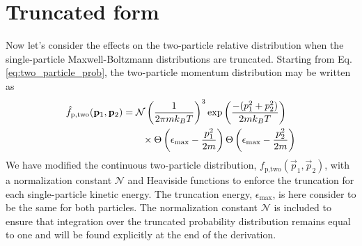 \section{Truncated form}\label{sec:truncDist}
Now let's consider the effects on the two-particle relative distribution when the single-particle Maxwell-Boltzmann distributions are truncated.
Starting from Eq.\,\ref{eq:two_particle_prob}, the two-particle momentum distribution may be written as
\begin{equation}
\begin{split}
	\hat{f}_\text{p,two} (\mathbf{p}_1, \mathbf{p}_2) &= \mathcal{N} \left(\frac{1}{2 \pi m k_B T}\right)^3 \text{exp}\left( { \frac{-(p_1^2 + p_2^2)}{2 m k_B T}} \right) \\ &\quad\quad \times \Theta \left( {\epsilon_\text{max} - \frac{p_1^2}{2m}} \right) \Theta \left( {\epsilon_\text{max} - \frac{p_2^2}{2m}} \right)
\end{split}
\end{equation}
We have modified the continuous two-particle distribution, $f_\text{p,two}(\vec{p}_1,\vec{p}_2)$, with a normalization constant $\mathcal{N}$ and Heaviside functions to enforce the truncation for each single-particle kinetic energy.
The truncation energy, $\epsilon_\text{max}$, is here consider to be the same for both particles.
The normalization constant $\mathcal{N}$ is included to ensure that integration over the truncated probability distribution remains equal to one and will be found explicitly at the end of the derivation.

